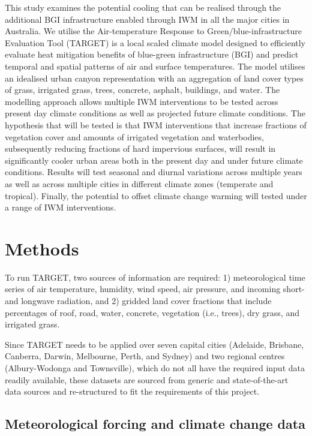 \documentclass[utf8]{frontiersSCNS} %
\begin{document}
This study examines the potential cooling that can be realised through the additional BGI infrastructure enabled through IWM in all the major cities in Australia. We utilise the Air-temperature Response to Green/blue-infrastructure Evaluation Tool (TARGET) \citep{Broadbent2019} is a local scaled climate model designed to efficiently evaluate heat mitigation benefits of blue-green infrastructure (BGI) and predict temporal and spatial patterns of air and surface temperatures. The model utilises an idealised urban canyon representation with an aggregation of land cover types of grass, irrigated grass, trees, concrete, asphalt, buildings, and water. The modelling approach allows multiple IWM interventions to be tested across present day climate conditions as well as projected future climate conditions. The hypothesis that will be tested is that IWM interventions that increase fractions of vegetation cover and amounts of irrigated vegetation and waterbodies, subsequently reducing fractions of hard impervious surfaces, will result in significantly cooler urban areas both in the present day and under future climate conditions. Results will test seasonal and diurnal variations across multiple years as well as across multiple cities in different climate zones (temperate and tropical). Finally, the potential to offset climate change warming will tested under a range of IWM interventions.


\section{Methods}\label{sec:methods}


To run TARGET, two sources of information are required: 1) meteorological time series of air temperature, humidity, wind speed, air pressure, and incoming short- and longwave radiation, and 2) gridded land cover fractions that include percentages of roof, road, water, concrete, vegetation (i.e., trees), dry grass, and irrigated grass. 

Since TARGET needs to be applied over seven capital cities (Adelaide, Brisbane, Canberra, Darwin, Melbourne, Perth, and Sydney) and two regional centres (Albury-Wodonga and Townsville), which do not all have the required input data readily available, these datasets are sourced from generic and state-of-the-art data sources and re-structured to fit the requirements of this project. 

\subsection{Meteorological forcing and climate change data}\label{sec:forcing}
\end{document}
